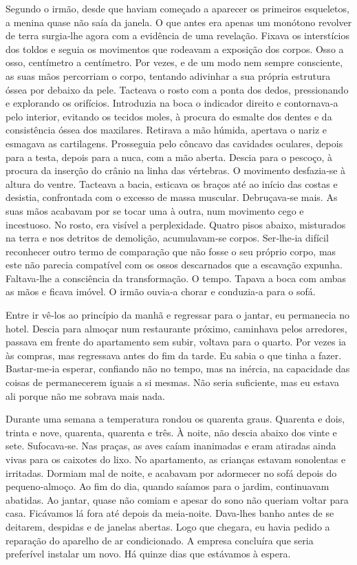 Segundo o irmão, desde que haviam começado a aparecer os primeiros
esqueletos, a menina quase não saía da janela. O que antes era apenas um
monótono revolver de terra surgia­‑lhe agora com a evidência de uma
revelação. Fixava os interstícios dos toldos e seguia os movimentos que
rodeavam a exposição dos corpos. Osso a osso, centímetro a centímetro.
Por vezes, e de um modo nem sempre consciente, as suas mãos percorriam o
corpo, tentando adivinhar a sua própria estrutura óssea por debaixo da
pele. Tacteava o rosto com a ponta dos dedos, pressionando e explorando
os orifícios. Introduzia na boca o indicador direito e contornava­‑a
pelo interior, evitando os tecidos moles, à procura do esmalte dos
dentes e da consistência óssea dos maxilares. Retirava a mão húmida,
apertava o nariz e esmagava as cartilagens. Prosseguia pelo côncavo das
cavidades oculares, depois para a testa, depois para a nuca, com a mão
aberta. Descia para o pescoço, à procura da inserção do crânio na linha
das vértebras. O movimento desfazia­‑se à altura do ventre. Tacteava a
bacia, esticava os braços até ao início das costas e desistia,
confrontada com o excesso de massa muscular. Debruçava­‑se mais. As suas
mãos acabavam por se tocar uma à outra, num movimento cego e incestuoso.
No rosto, era visível a perplexidade. Quatro pisos abaixo, misturados na
terra e nos detritos de demolição, acumulavam­‑se corpos. Ser­‑lhe­‑ia
difícil reconhecer outro termo de comparação que não fosse o seu próprio
corpo, mas este não parecia compatível com os ossos descarnados que a
escavação expunha. Faltava­‑lhe a consciência da transformação. O tempo.
Tapava a boca com ambas as mãos e ficava imóvel. O irmão ouvia­‑a chorar
e conduzia­‑a para o sofá.

Entre ir vê­‑los ao princípio da manhã e regressar para o jantar, eu
permanecia no hotel. Descia para almoçar num restaurante próximo,
caminhava pelos arredores, passava em frente do apartamento sem subir,
voltava para o quarto. Por vezes ia às compras, mas regressava antes do
fim da tarde. Eu sabia o que tinha a fazer. Bastar­‑me­‑ia esperar,
confiando não no tempo, mas na inércia, na capacidade das coisas de
permanecerem iguais a si mesmas. Não seria suficiente, mas eu estava ali
porque não me sobrava mais nada.

Durante uma semana a temperatura rondou os quarenta graus. Quarenta e
dois, trinta e nove, quarenta, quarenta e três. À noite, não descia
abaixo dos vinte e sete. Sufocava­‑se. Nas praças, as aves caíam
inanimadas e eram atiradas ainda vivas para os caixotes do lixo. No
apartamento, as crianças estavam sonolentas e irritadas. Dormiam mal de
noite, e acabavam por adormecer no sofá depois do pequeno­‑almoço. Ao
fim do dia, quando saíamos para o jardim, continuavam abatidas. Ao
jantar, quase não comiam e apesar do sono não queriam voltar para casa.
Ficávamos lá fora até depois da meia­‑noite. Dava­‑lhes banho antes de
se deitarem, despidas e de janelas abertas. Logo que chegara, eu havia
pedido a reparação do aparelho de ar condicionado. A empresa concluíra
que seria preferível instalar um novo. Há quinze dias que estávamos à
espera.

